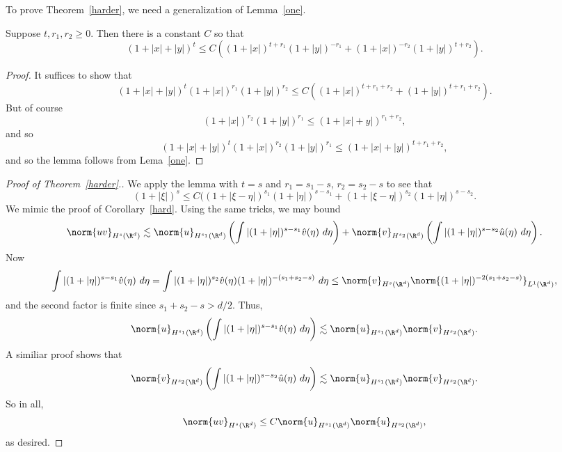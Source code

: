 \documentclass[12pt]{article}
\begin{document}
To prove Theorem~\ref{harder}, we need a generalization of Lemma~\ref{one}.
\begin{lem}Suppose $t,r_1,r_2 \geq 0$. Then there is a constant $C$ so that
\[(1+|x|+|y|)^{t} \leq C((1+|x|)^{t+r_1}(1+|y|)^{-r_1} + (1+|x|)^{-r_2}(1+|y|)^{t+r_2}).\]\end{lem}
\begin{proof}
It suffices to show that
\[(1+|x|+|y|)^{t}(1+|x|)^{r_1}(1+|y|)^{r_2} \leq C((1+|x|)^{t+r_1+r_2} + (1+|y|)^{t+r_1+r_2}).\] But of course
\[(1+|x|)^{r_2}(1+|y|)^{r_1} \leq (1+|x|+y|)^{r_1+r_2},\] and so
\[(1+|x|+|y|)^{t}(1+|x|)^{r_2}(1+|y|)^{r_1} \leq (1+|x|+|y|)^{t+r_1+r_2},\] and so the lemma follows from Lema~\ref{one}.\end{proof}

\begin{proof}[Proof of Theorem~\ref{harder}.] We apply the lemma with $t=s$ and $r_1 = s_1-s$, $r_2 = s_2-s$ to see that
\[(1+|\xi|)^s \leq C((1+|\xi-\eta|)^{s_1}(1+|\eta|)^{s-s_1} + (1+|\xi-\eta|)^{s_2}(1+|\eta|)^{s-s_2}.\] We mimic the proof of Corollary~\ref{hard}. Using the same tricks, we may bound
\[\norm{uv}_{H^s(\R^d)} \lesssim  \norm{u}_{H^{s_1}(\R^d)}\left(\int |(1+|\eta|)^{s-s_1}\hat{v}(\eta)\ d\eta\right) + \norm{v}_{H^{s_2}(\R^d)}\left(\int |(1+|\eta|)^{s-s_2}\hat{u}(\eta)\ d\eta\right).\]
Now 
\[\int |(1+|\eta|)^{s-s_1}\hat{v}(\eta)\ d\eta = \int |(1+|\eta|)^{s_2}\hat{v}(\eta)(1+|\eta|)^{-(s_1+s_2-s)}\ d\eta \leq \norm{v}_{H^s(\R^d)}\norm{(1+|\eta|)^{-2(s_1+s_2-s)}}_{L^1(\R^d)},\]
and the second factor is finite since $s_1+s_2-s > d/2$. Thus,
\[\norm{u}_{H^{s_1}(\R^d)}\left(\int |(1+|\eta|)^{s-s_1}\hat{v}(\eta)\ d\eta\right) \lesssim \norm{u}_{H^{s_1}(\R^d)}\norm{v}_{H^{s_2}(\R^d)}.\] A similiar proof shows that
\[\norm{v}_{H^{s_2}(\R^d)}\left(\int |(1+|\eta|)^{s-s_2}\hat{u}(\eta)\ d\eta\right) \lesssim \norm{u}_{H^{s_1}(\R^d)}\norm{v}_{H^{s_2}(\R^d)}.\] So in all,
\[\norm{uv}_{H^s(\R^d)} \leq C\norm{u}_{H^{s_1}(\R^d)}\norm{u}_{H^{s_2}(\R^d)},\]
as desired.\end{proof}
\end{document}
